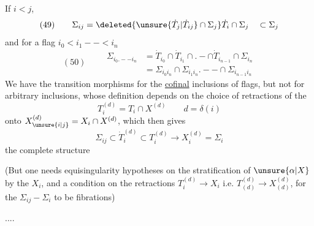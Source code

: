 If $i<j$, 
\[
(49)\qquad\Sigma_{ij}=\deleted{\unsure{\dot T_j|\dot T_{ij}}\cap\Sigma_j}
\dot T_i\cap\Sigma_j\quad\subset\Sigma_j
\]
and for a flag $i_0<i_1--<i_n$
\[
(50)\qquad\begin{aligned}
\Sigma_{i_0.--i_n}&=\dot T_{i_0}\cap\dot T_{i_1}\cap .-\cap
\dot T_{i_{n-1}}\cap\Sigma_{i_n}\\
&=\Sigma_{i_0i_n}\cap\Sigma_{i_1i_n}.--\cap\Sigma_{i_{n-1}i_n}
\end{aligned}
\]
We have  the transition morphisms
 for the
 \uline{cofinal} inclusions of flags,
but not for arbitrary inclusions, whose definition depends
on the choice of retractions of the
\[
T_i^{(d)}=T_i\cap X^{(d)}\qquad d=\delta(i)
\]
onto $X_{\unsure{i|j}}^{(d)}=X_i\cap X^{(d)}$, which then gives
\[
\Sigma_{ij}\subset\dot T_i^{(d)}\subset T_i^{(d)}
\longrightarrow X_i^{(d)}=\Sigma_i
\]
the complete structure

(But one needs equisingularity hypotheses on the
 stratification of $\unsure{\alpha|X}$ by the $X_i$,
and a condition 
on the retractions
$T_i^{(d)}\longrightarrow X_i$ i.e. 
$T_{(d)}^{(d)}\longrightarrow X_{(d)}^{(d)}$,
for the $\Sigma_{ij}\mathrel{-}\Sigma_i$ to be fibrations)

....
